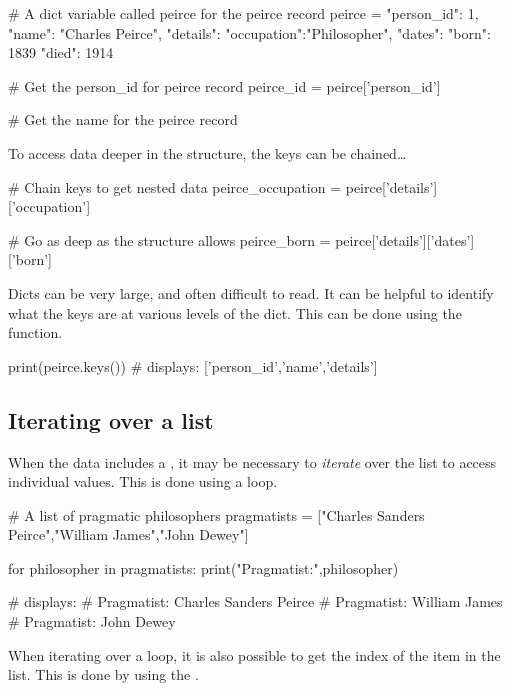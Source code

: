 \begin{pycode}
    # A dict variable called peirce for the peirce record
    peirce = {
    "person_id": 1,
    "name": "Charles Peirce",
    "details": {
    "occupation":"Philosopher",
    "dates": {
    "born": 1839
    "died": 1914
    }
    }
    }

    # Get the person_id for peirce record
    peirce_id = peirce['person_id']

    # Get the name for the peirce record
\end{pycode}

To access data deeper in the structure, the keys can be chained\dots

\begin{pycode}
    # Chain keys to get nested data
    peirce_occupation = peirce['details']['occupation']

    # Go as deep as the structure allows
    peirce_born = peirce['details']['dates']['born']
\end{pycode}

Dicts can be very large, and often difficult to read. It can be helpful to identify what the keys are at various levels of the dict. This can be done using the  function.

\begin{pycode}
    print(peirce.keys())
    # displays: ['person_id','name','details']
\end{pycode}

\subsection{Iterating over a list}

When the data includes a , it may be necessary to \textit{iterate} over the list to access individual values. This is done using a  loop.

\begin{pycode}
    # A list of pragmatic philosophers
    pragmatists = ["Charles Sanders Peirce","William James","John Dewey"]

    for philosopher in pragmatists:
    print("Pragmatist:",philosopher)

    # displays:
    # Pragmatist: Charles Sanders Peirce
    # Pragmatist: William James
    # Pragmatist: John Dewey
\end{pycode}

When iterating over a loop, it is also possible to get the index of the item in the list. This is done by using the .

